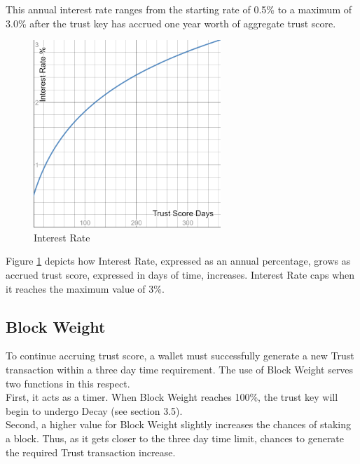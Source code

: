 \documentclass[11pt]{article}
\begin{document}
\noindent This annual interest rate ranges from the starting rate of 0.5\% to a maximum of 3.0\% after the trust key has accrued one year worth of aggregate trust score. \\

\begin{figure}[h!]
    \centering
    \includegraphics[width=0.63\textwidth]{images/interestRate.png}
    \caption{Interest Rate \label{fig:interestRate}}
\end{figure}

\noindent Figure \ref{fig:interestRate} depicts how Interest Rate, expressed as an annual percentage, grows as accrued trust score, expressed in days of time, increases. Interest Rate caps when it reaches the maximum value of 3\%.\\

\subsection{Block Weight}
To continue accruing trust score, a wallet must successfully generate a new Trust transaction within a three day time requirement. The use of Block Weight serves two functions in this respect.\\

\noindent First, it acts as a timer. When Block Weight reaches 100\%, the trust key will begin to undergo Decay (see section 3.5).\\

\noindent Second, a higher value for Block Weight slightly increases the chances of staking a block. Thus, as it gets closer to the three day time limit, chances to generate the required Trust transaction increase.\\
\end{document}
